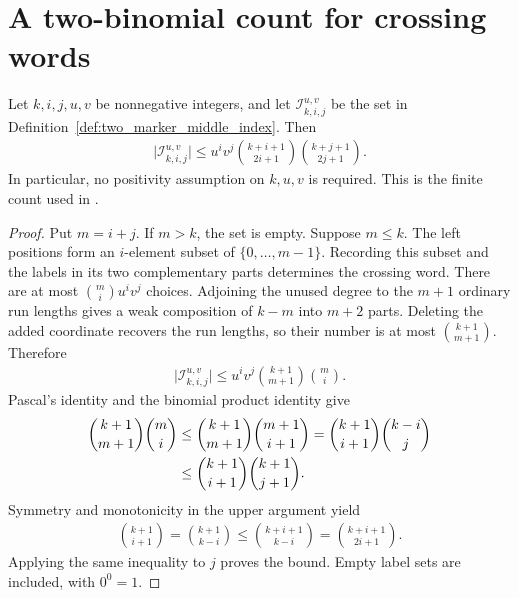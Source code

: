 \section{A two-binomial count for crossing words}

\begin{lemma}
    \label{thm:two_marker_index_two_binomial}
    \leanok
    Let $k,i,j,u,v$ be nonnegative integers, and let
    $\mathcal I_{k,i,j}^{u,v}$ be the set in
    Definition~\ref{def:two_marker_middle_index}. Then
    \begin{align}
        \bigl|\mathcal I_{k,i,j}^{u,v}\bigr|
        \le u^i v^j
        \binom{k+i+1}{2i+1}\binom{k+j+1}{2j+1}.
    \end{align}
    In particular, no positivity assumption on $k,u,v$ is required.
    This is the finite count used in
    \cite[Proposition~5.7]{Arad2016RigorousRG}.
\end{lemma}
\begin{proof}\leanok
    Put $m=i+j$. If $m>k$, the set is empty. Suppose $m\le k$.
    The left positions form an $i$-element subset of $\{0,\ldots,m-1\}$.
    Recording this subset and the labels in its two complementary parts
    determines the crossing word. There are at most $\binom{m}{i}u^i v^j$
    choices. Adjoining the unused degree to the $m+1$ ordinary run lengths
    gives a weak composition of $k-m$ into $m+2$ parts. Deleting the added
    coordinate recovers the run lengths, so their number is at most
    $\binom{k+1}{m+1}$. Therefore
    \begin{align}
        \bigl|\mathcal I_{k,i,j}^{u,v}\bigr|
        \le u^i v^j\binom{k+1}{m+1}\binom{m}{i}.
    \end{align}
    Pascal's identity and the binomial product identity give
    \begin{align}
        \binom{k+1}{m+1}\binom{m}{i}
         & \le\binom{k+1}{m+1}\binom{m+1}{i+1}
        =\binom{k+1}{i+1}\binom{k-i}{j} \notag  \\
         & \le\binom{k+1}{i+1}\binom{k+1}{j+1}.
    \end{align}
    Symmetry and monotonicity in the upper argument yield
    \begin{align}
        \binom{k+1}{i+1}
        =\binom{k+1}{k-i}
        \le\binom{k+i+1}{k-i}
        =\binom{k+i+1}{2i+1}.
    \end{align}
    Applying the same inequality to $j$ proves the bound. Empty label sets
    are included, with $0^0=1$.
\end{proof}
